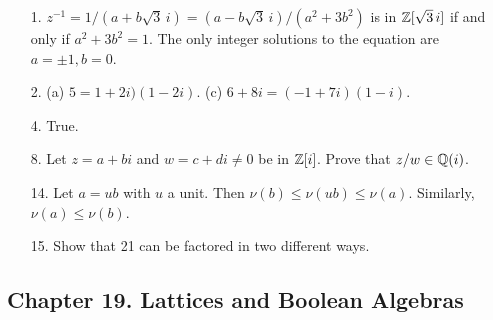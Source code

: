 {\small
\begin{itemize}
 
\item[1.]
$z^{-1} = 1/(a + b\sqrt{3}\, i) = (a -b \sqrt{3}\, i)/(a^2 + 3b^2)$ is in
${\Bbb Z}[\sqrt{3}\, i]$ if and only if $a^2 + 3 b^2 = 1$.  The only
integer solutions to the equation are $a = \pm 1, b = 0$.

 
\item[2.]
(a) $5 = 1 + 2i)(1 -2i)$.
(c) $6 + 8i = (-1+7i)(1-i)$.
 
\item[4.]
True.


\item[8.]
Let $z=a + bi$ and $w=c + di \neq 0$ be in ${\Bbb Z}[i]$. Prove that
$z/w \in {\Bbb Q}(i)$.



 
\item[14.]
Let $a = ub$ with $u$ a unit. Then $\nu(b) \leq \nu(ub) \leq \nu(a)$.
Similarly, $\nu(a) \leq \nu(b)$.
 

\item[15.]
Show that 21 can be factored in two different ways.



\end{itemize}
}



\subsection*{Chapter 19. Lattices and Boolean Algebras}
 
